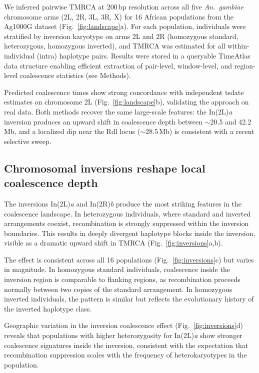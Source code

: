 \documentclass[10pt]{article}
\begin{document}
We inferred pairwise TMRCA at 200\,bp resolution across all five
\textit{An.~gambiae} chromosome arms (2L, 2R, 3L, 3R, X) for 16 African
populations from the Ag1000G dataset (Fig.~\ref{fig:landscape}a). For each
population, individuals were stratified by inversion karyotype on arms 2L
and 2R (homozygous standard, heterozygous, homozygous inverted), and TMRCA
was estimated for all within-individual (intra) haplotype pairs. Results were
stored in a queryable TimeAtlas data structure enabling efficient extraction
of pair-level, window-level, and region-level coalescence statistics (see
Methods).

Predicted coalescence times show strong concordance with independent
tsdate~\citep{wohns2022unified} estimates on chromosome 2L
(Fig.~\ref{fig:landscape}b), validating the approach on real data. Both
methods recover the same large-scale features: the In(2L)\textit{a} inversion
produces an upward shift in coalescence depth between $\sim$20.5 and 42.2\,Mb,
and a localized dip near the Rdl locus ($\sim$28.5\,Mb) is consistent with a
recent selective sweep.

\subsection*{Chromosomal inversions reshape local coalescence depth}

The inversions In(2L)\textit{a} and In(2R)\textit{b} produce the most
striking features in the coalescence landscape. In heterozygous individuals,
where standard and inverted arrangements coexist, recombination is strongly
suppressed within the inversion boundaries. This results in deeply divergent
haplotype blocks inside the inversion, visible as a dramatic upward shift in
TMRCA (Fig.~\ref{fig:inversions}a,b).

The effect is consistent across all 16 populations
(Fig.~\ref{fig:inversions}c) but varies in magnitude. In homozygous standard
individuals, coalescence inside the inversion region is comparable to flanking
regions, as recombination proceeds normally between two copies of the standard
arrangement. In homozygous inverted individuals, the pattern is similar but
reflects the evolutionary history of the inverted haplotype class.

Geographic variation in the inversion coalescence effect
(Fig.~\ref{fig:inversions}d) reveals that populations with higher
heterozygosity for In(2L)\textit{a} show stronger coalescence signatures
inside the inversion, consistent with the expectation that recombination
suppression scales with the frequency of heterokaryotypes in the population.
\end{document}
